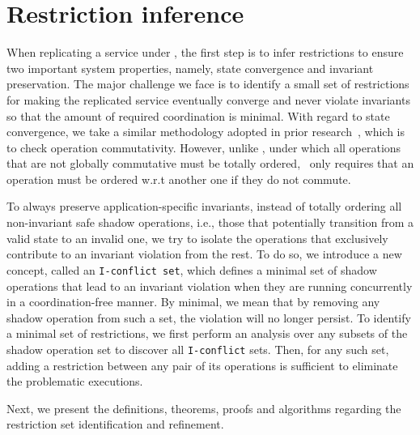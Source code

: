 \section{Restriction inference}
\label{ch:por:sect:infer}
When replicating a service under \PRCN, the first step is to
infer restrictions to ensure two important system 
properties, namely, state convergence and invariant preservation. 
The major challenge we face is to identify a small set of restrictions for
making the replicated service eventually converge and never violate invariants so
that the amount of required coordination is minimal.
With regard to state convergence, we take a similar
methodology adopted in prior research~\cite{Shapiro2011CRDTs,
Li2012RedBlue, Li2014SIEVE}, which is to check operation commutativity.
However, unlike \RBCN, under which all operations that are not globally commutative must be totally ordered,
\PRCN\ only requires that an operation must be ordered w.r.t another one if
they do not commute.

To always preserve application-specific invariants,
instead of totally ordering all non-invariant safe
shadow operations, i.e., those that potentially transition from a valid state
to an invalid one, we try to isolate
the operations that exclusively contribute to an invariant violation from
the rest. To do so, we introduce
a new concept, called an {\tt I-conflict set}, which defines a minimal set of
shadow operations that lead to an invariant violation when they are running
concurrently in a coordination-free manner. By minimal, we mean that by removing 
any shadow operation from such a set, the violation will no longer persist. 
To identify a minimal set of restrictions, we first perform an analysis over any subsets of the shadow 
operation set to discover all {\tt I-conflict} sets. Then, for any such set, adding a 
restriction between any pair of its operations is sufficient to eliminate 
the problematic executions.

Next, we present the definitions, theorems, proofs and algorithms
regarding the restriction set identification and refinement.



